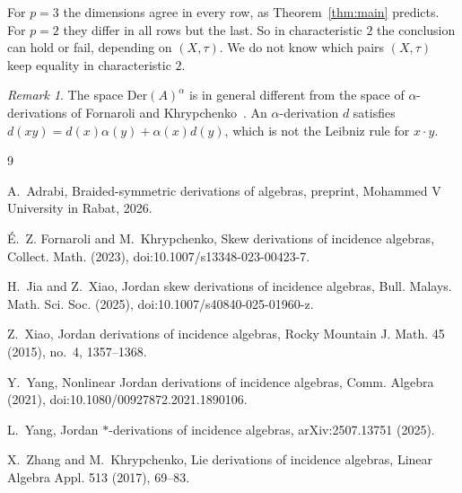 \documentclass[]{interact}
\theoremstyle{plain}
\theoremstyle{definition}
\theoremstyle{remark}
\newtheorem{remark}[theorem]{Remark}
\newcommand{\Der}{\mathrm{Der}}
\begin{document}
For $p = 3$ the dimensions agree in every row, as Theorem~\ref{thm:main} predicts.
For $p = 2$ they differ in all rows but the last.
So in characteristic $2$ the conclusion can hold or fail, depending on $(X,\tau)$.
We do not know which pairs $(X,\tau)$ keep equality in characteristic $2$.

\begin{remark}
The space $\Der(A)^\alpha$ is in general different from the space of $\alpha$-derivations of Fornaroli and Khrypchenko~\cite{FornaroliKhrypchenko2023}.
An $\alpha$-derivation $d$ satisfies $d(xy) = d(x)\alpha(y) + \alpha(x)d(y)$, which is not the Leibniz rule for $x \cdot y$.
\end{remark}

\begin{thebibliography}{9}

A.~Adrabi, Braided-symmetric derivations of algebras, preprint, Mohammed V University in Rabat, 2026.

\'E.~Z. Fornaroli and M.~Khrypchenko, Skew derivations of incidence algebras, Collect. Math. (2023), doi:10.1007/s13348-023-00423-7.

H.~Jia and Z.~Xiao, Jordan skew derivations of incidence algebras, Bull. Malays. Math. Sci. Soc. (2025), doi:10.1007/s40840-025-01960-z.

Z.~Xiao, Jordan derivations of incidence algebras, Rocky Mountain J. Math. 45 (2015), no.~4, 1357--1368.

Y.~Yang, Nonlinear Jordan derivations of incidence algebras, Comm. Algebra (2021), doi:10.1080/00927872.2021.1890106.

L.~Yang, Jordan $*$-derivations of incidence algebras, arXiv:2507.13751 (2025).

X.~Zhang and M.~Khrypchenko, Lie derivations of incidence algebras, Linear Algebra Appl. 513 (2017), 69--83.

\end{thebibliography}
\end{document}
